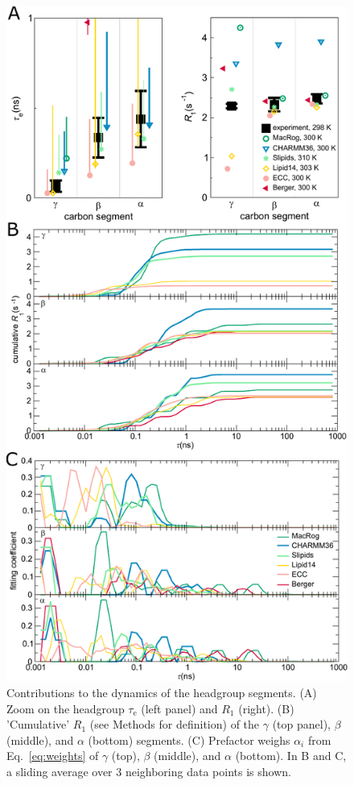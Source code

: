 \documentclass[journal=jcisd8,manuscript=article,layout=twocolumn]{achemso}
\begin{document}
\begin{figure}[!h]
\centering
\includegraphics[width=\columnwidth]{../Figs/cumulativeR1.pdf}
\caption{Contributions to the dynamics of the headgroup segments.
(A) Zoom on the headgroup $\tau_\mathrm e$ (left panel) and $R_1$ (right).
(B) 'Cumulative' $R_1$ (see Methods for definition) of the
$\gamma$ (top panel), $\beta$ (middle), and $\alpha$ (bottom) segments.
(C) Prefactor weighs $\alpha_i$ from Eq.~\eqref{eq:weights} of $\gamma$ (top), $\beta$ (middle), and $\alpha$ (bottom).
In B and C, a sliding average over 3 neighboring data points is shown.
}
\label{fig:cumulativeR1s}
\end{figure}
\end{document}
